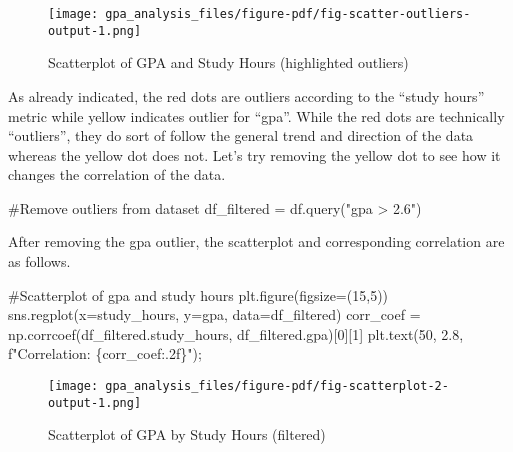 \documentclass[
  letterpaper,
  DIV=11,
  numbers=noendperiod]{scrreprt}
\newenvironment{Shaded}{\begin{snugshade}}{\end{snugshade}}
\newcommand{\CommentTok}[1]{\textcolor[rgb]{0.37,0.37,0.37}{#1}}
\newcommand{\DecValTok}[1]{\textcolor[rgb]{0.68,0.00,0.00}{#1}}
\newcommand{\FloatTok}[1]{\textcolor[rgb]{0.68,0.00,0.00}{#1}}
\newcommand{\NormalTok}[1]{\textcolor[rgb]{0.00,0.23,0.31}{#1}}
\newcommand{\OperatorTok}[1]{\textcolor[rgb]{0.37,0.37,0.37}{#1}}
\newcommand{\SpecialCharTok}[1]{\textcolor[rgb]{0.37,0.37,0.37}{#1}}
\newcommand{\SpecialStringTok}[1]{\textcolor[rgb]{0.13,0.47,0.30}{#1}}
\newcommand{\StringTok}[1]{\textcolor[rgb]{0.13,0.47,0.30}{#1}}
\begin{document}
\begin{figure}[H]

{\centering \texttt{[image: gpa\_analysis\_files/figure-pdf/fig-scatter-outliers-output-1.png]}

}

\caption{\label{fig-scatter-outliers}Scatterplot of GPA and Study Hours
(highlighted outliers)}

\end{figure}

As already indicated, the red dots are outliers according to the ``study
hours'' metric while yellow indicates outlier for ``gpa''. While the red
dots are technically ``outliers'', they do sort of follow the general
trend and direction of the data whereas the yellow dot does not. Let's
try removing the yellow dot to see how it changes the correlation of the
data.

\begin{Shaded}
\begin{Highlighting}[]
\CommentTok{\#Remove outliers from dataset}
\NormalTok{df\_filtered }\OperatorTok{=}\NormalTok{ df.query(}\StringTok{"gpa \textgreater{} 2.6"}\NormalTok{)}
\end{Highlighting}
\end{Shaded}

After removing the gpa outlier, the scatterplot and corresponding
correlation are as follows.

\begin{Shaded}
\begin{Highlighting}[]
\CommentTok{\#Scatterplot of gpa and study hours}
\NormalTok{plt.figure(figsize}\OperatorTok{=}\NormalTok{(}\DecValTok{15}\NormalTok{,}\DecValTok{5}\NormalTok{))}
\NormalTok{sns.regplot(x}\OperatorTok{=}\StringTok{\textquotesingle{}study\_hours\textquotesingle{}}\NormalTok{, y}\OperatorTok{=}\StringTok{\textquotesingle{}gpa\textquotesingle{}}\NormalTok{, data}\OperatorTok{=}\NormalTok{df\_filtered)}
\NormalTok{corr\_coef }\OperatorTok{=}\NormalTok{ np.corrcoef(df\_filtered.study\_hours, df\_filtered.gpa)[}\DecValTok{0}\NormalTok{][}\DecValTok{1}\NormalTok{]}
\NormalTok{plt.text(}\DecValTok{50}\NormalTok{, }\FloatTok{2.8}\NormalTok{, }\SpecialStringTok{f"Correlation: }\SpecialCharTok{\{}\NormalTok{corr\_coef}\SpecialCharTok{:.2f\}}\SpecialStringTok{"}\NormalTok{)}\OperatorTok{;}
\end{Highlighting}
\end{Shaded}

\begin{figure}[H]

{\centering \texttt{[image: gpa\_analysis\_files/figure-pdf/fig-scatterplot-2-output-1.png]}

}

\caption{\label{fig-scatterplot-2}Scatterplot of GPA by Study Hours
(filtered)}

\end{figure}
\end{document}
